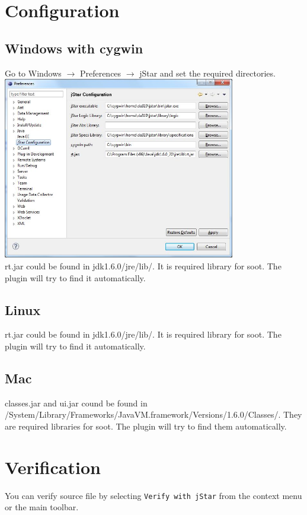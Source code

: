 \documentclass{article}
\begin{document}
\section{Configuration}

\subsection{Windows with cygwin}

Go to Windows $\rightarrow$ Preferences $\rightarrow$ jStar and set the required directories.\\

\includegraphics[width=4in]{images/preferences.jpg}\\

rt.jar could be found in jdk1.6.0/jre/lib/. It is required library for soot. The plugin will try to find it automatically. 

\subsection{Linux}
rt.jar could be found in jdk1.6.0/jre/lib/. It is required library for soot. The plugin will try to find it automatically. 

\subsection{Mac}
classes.jar and ui.jar cound be found in \\ /System/Library/Frameworks/JavaVM.framework/Versions/1.6.0/Classes/.  They are required libraries for soot. The plugin will try to find them automatically. 

\section{Verification}
You can verify source file by selecting \texttt{Verify with jStar} from the context menu or the main toolbar. 
\end{document}
